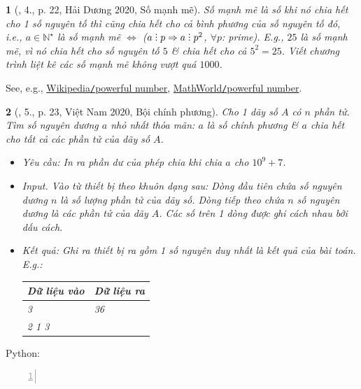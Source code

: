 \documentclass{article}
\newtheorem{baitoan}{}
\DeclareRobustCommand{\divby}{%
	\mathrel{\vbox{\baselineskip.65ex\lineskiplimit0pt\hbox{.}\hbox{.}\hbox{.}}}%
}
\begin{document}
\begin{baitoan}[\cite{VietSTEM2021}, 4., p. 22, Hải Dương 2020, Số mạnh mẽ]
	\emph{Số mạnh mẽ} là số khi nó chia hết cho 1 số nguyên tố thì cũng chia hết cho cả bình phương của số nguyên tố đó, i.e., $a\in\mathbb{N}^\star$ là số mạnh mẽ $\Leftrightarrow$ ($a\divby p\Rightarrow a\divby p^2$, $\forall p$: prime). E.g., $25$ là số mạnh mẽ, vì nó chia hết cho số nguyên tố $5$ \& chia hết cho cả $5^2 = 25$. Viết chương trình liệt kê các số mạnh mẽ không vượt quá $1000$.
\end{baitoan}
See, e.g., \href{https://en.wikipedia.org/wiki/Powerful_number}{Wikipedia{\tt/}powerful number}, \href{https://mathworld.wolfram.com/PowerfulNumber.html}{MathWorld{\tt/}powerful number}.

\begin{baitoan}[\cite{VietSTEM2021}, 5., p. 23, Việt Nam 2020, Bội chính phương]
	Cho 1 dãy số $A$ có $n$ phần tử. Tìm số nguyên dương $a$ nhỏ nhất thỏa mãn: $a$ là số chính phương \& $a$ chia hết cho tất cả các phần tử của dãy số $A$.
	\begin{itemize}
		\item {\sf Yêu cầu:} In ra phần dư của phép chia khi chia $a$ cho $10^9 + 7$.
		\item {\sf Input.} Vào từ thiết bị theo khuôn dạng sau: Dòng đầu tiên chứa số nguyên dương $n$ là số lượng phần tử của dãy số. Dòng tiếp theo chứa $n$ số nguyên dương là các phần tử của dãy $A$. Các số trên 1 dòng được ghi cách nhau bởi dấu cách.
		\item {\sf Kết quả:} Ghi ra thiết bị ra gồm 1 số nguyên duy nhất là kết quả của bài toán. E.g.:
		\begin{table}[H]
			\centering
			\begin{tabular}{|l|l|}
				\hline
				Dữ liệu vào & Dữ liệu ra \\
				\hline
				3 & 36 \\
				2 1 3 &  \\
				\hline
			\end{tabular}
		\end{table}
	\end{itemize}
\end{baitoan}
Python:
\begin{Verbatim}[numbers=left,xleftmargin=5mm]
	
\end{Verbatim}
\end{document}
